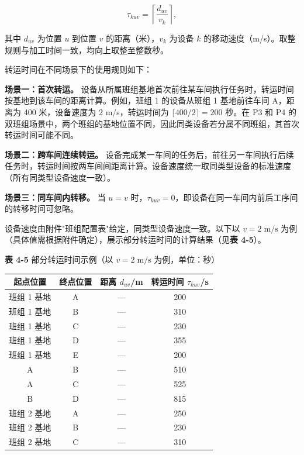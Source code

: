 \documentclass[UTF8,a4paper,12pt]{ctexart}
\begin{document}
\begin{equation}
\tau_{kuv} = \left\lceil \frac{d_{uv}}{v_k} \right\rceil,
\end{equation}

其中 $d_{uv}$ 为位置 $u$ 到位置 $v$ 的距离（米），$v_k$ 为设备 $k$ 的移动速度（m/s）。取整规则与加工时间一致，均向上取整至整数秒。

转运时间在不同场景下的使用规则如下：

\textbf{场景一：首次转运。} 设备从所属班组基地首次前往某车间执行任务时，转运时间按基地到该车间的距离计算。例如，班组 1 的设备从班组 1 基地前往车间 A，距离为 400 米，设备速度为 2 m/s，转运时间为 $\lceil 400/2 \rceil = 200$ 秒。在 P3 和 P4 的双班组场景中，两个班组的基地位置不同，因此同类设备若分属不同班组，其首次转运时间可能不同。

\textbf{场景二：跨车间连续转运。} 设备完成某一车间的任务后，前往另一车间执行后续任务时，转运时间按两车间间距离计算。设备速度统一取同类型设备的标准速度（所有同类型设备速度一致）。

\textbf{场景三：同车间内转移。} 当 $u = v$ 时，$\tau_{kuv} = 0$，即设备在同一车间内前后工序间的转移时间可忽略。

设备速度由附件"班组配置表"给定，同类型设备速度一致。以下以 $v = 2 \; \text{m/s}$ 为例（具体值需根据附件确定），展示部分转运时间的计算结果（见\textbf{表 4-5}）。

\begin{center}
\textbf{表 4-5} 部分转运时间示例（以 $v = 2 \; \text{m/s}$ 为例，单位：秒）
\begin{tabular}{cccc}
\toprule
起点位置 & 终点位置 & 距离 $d_{uv}$/m & 转运时间 $\tau_{kuv}$/s \\
\midrule
班组 1 基地 & A & — & 200 \\
班组 1 基地 & B & — & 310 \\
班组 1 基地 & C & — & 230 \\
班组 1 基地 & D & — & 355 \\
班组 1 基地 & E & — & 200 \\
A & B & — & 510 \\
A & C & — & 525 \\
B & D & — & 815 \\
班组 2 基地 & A & — & 250 \\
班组 2 基地 & B & — & 230 \\
班组 2 基地 & C & — & 310 \\
\bottomrule
\end{tabular}
\end{center}
\end{document}
